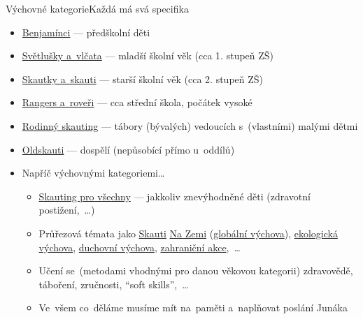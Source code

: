 \documentclass[compress, ucs, xelatex, 11pt, xcolor=dvipsnames, print, aspectratio=169,
	hyperref={
		bookmarks=true,
		unicode=true,
		colorlinks=true,
		pdftitle={Skautska vychovna metoda},
		plainpages=false,
		pdfauthor={Vojtech Zeisek},
		pdfsubject={Skautska vychovna metoda a jeji vyvoj za posledni stoleti a desetileti},
		pdfcreator={XeLaTeX},
		pdfkeywords={Junak, Pedagogika, Skaut, Skauting, Vychovna metoda},
		linkcolor=Red, %
		anchorcolor=ForestGreen, %
		citecolor=ForestGreen, %
		filecolor=ForestGreen, %
		menucolor=ForestGreen, %
		urlcolor=Sepia, %
		pdftex},
	url={hyphens, lowtilde} %
	]{beamer}
\begin{document}
\begin{frame}{Výchovné kategorie}{Každá má svá specifika}
	\begin{itemize}
		\item \href{https://krizovatka.skaut.cz/oddil/program/benjaminci}{Benjamínci} --- předškolní děti
		\item \href{https://krizovatka.skaut.cz/oddil/program/svetlusky-a-vlcata}{Světlušky a~vlčata} --- mladší školní věk (cca 1. stupeň ZŠ)
		\item \href{https://krizovatka.skaut.cz/oddil/program/skautky-a-skauti}{Skautky a~skauti} --- starší školní věk (cca 2. stupeň ZŠ)
		\item \href{https://krizovatka.skaut.cz/oddil/program/rangers-a-roveri}{Rangers a~roveři} --- cca střední škola, počátek vysoké
		\item \href{https://krizovatka.skaut.cz/oddil/program/rodinny-skauting}{Rodinný skauting} --- tábory (bývalých) vedoucích s~(vlastními) malými dětmi
		\item \href{https://krizovatka.skaut.cz/oddil/program/dospeli}{Oldskauti} --- dospělí (nepůsobící přímo u~oddílů)
		\item Napříč výchovnými kategoriemi\ldots
		\begin{itemize}
			\item \href{https://krizovatka.skaut.cz/organizace/ustredi/odbory/odbory-spv}{Skauting pro všechny} --- jakkoliv znevýhodněné děti (zdravotní postižení,~\ldots)
			\item Průřezová témata jako \href{https://krizovatka.skaut.cz/organizace/ustredi/odbory/skauti-na-zemi}{Skauti} \href{https://www.skautinazemi.cz/}{Na Zemi} (\href{https://www.nazemi.cz/cs/skauti}{globální výchova}), \href{https://krizovatka.skaut.cz/organizace/ustredi/odbory/ekoodbor/}{ekologická výchova}, \href{https://krizovatka.skaut.cz/organizace/ustredi/odbory/odbory-duchovni-vychovy}{duchovní výchova}, \href{https://krizovatka.skaut.cz/organizace/ustredi/odbory/odbory-zahranicni}{zahraniční akce},~\ldots
			\item Učení se~(metodami vhodnými pro danou věkovou kategorii) zdravovědě, táboření, zručnosti, \enquote{soft skills},~\ldots
			\item Ve~všem co~děláme musíme mít na~paměti a~naplňovat poslání Junáka
		\end{itemize}
	\end{itemize}
\end{frame}
\end{document}
